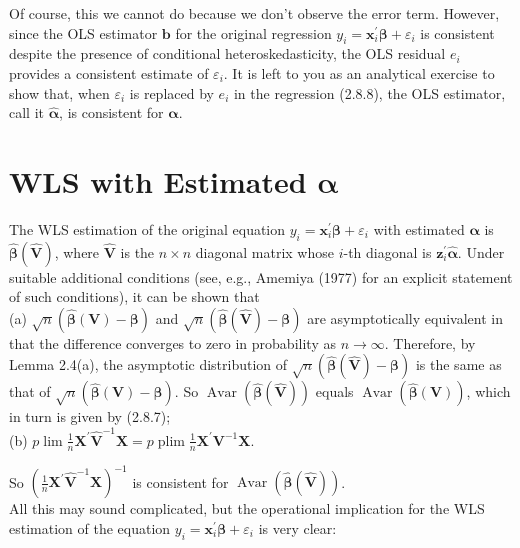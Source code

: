 \documentclass[10pt]{article}
\begin{document}
Of course, this we cannot do because we don't observe the error term. However, since the OLS estimator $\mathbf{b}$ for the original regression $y_{i}=\mathbf{x}_{i}^{\prime} \boldsymbol{\beta}+\varepsilon_{i}$ is consistent despite the presence of conditional heteroskedasticity, the OLS residual $e_{i}$ provides a consistent estimate of $\varepsilon_{i}$. It is left to you as an analytical exercise to show that, when $\varepsilon_{i}$ is replaced by $e_{i}$ in the regression (2.8.8), the OLS estimator, call it $\hat{\boldsymbol{\alpha}}$, is consistent for $\boldsymbol{\alpha}$.

\section*{WLS with Estimated $\boldsymbol{\alpha}$}
The WLS estimation of the original equation $y_{i}=\mathbf{x}_{i}^{\prime} \boldsymbol{\beta}+\varepsilon_{i}$ with estimated $\boldsymbol{\alpha}$ is $\widehat{\boldsymbol{\beta}}(\widehat{\mathbf{V}})$, where $\widehat{\mathbf{V}}$ is the $n \times n$ diagonal matrix whose $i$-th diagonal is $\mathbf{z}_{i}^{\prime} \hat{\boldsymbol{\alpha}}$. Under suitable additional conditions (see, e.g., Amemiya (1977) for an explicit statement of such conditions), it can be shown that\\
(a) $\sqrt{n}(\widehat{\boldsymbol{\beta}}(\mathbf{V})-\boldsymbol{\beta})$ and $\sqrt{n}(\widehat{\boldsymbol{\beta}}(\widehat{\mathbf{V}})-\boldsymbol{\beta})$ are asymptotically equivalent in that the difference converges to zero in probability as $n \rightarrow \infty$. Therefore, by Lemma 2.4(a), the asymptotic distribution of $\sqrt{n}(\widehat{\boldsymbol{\beta}}(\widehat{\mathbf{V}})-\boldsymbol{\beta})$ is the same as that of $\sqrt{n}(\widehat{\boldsymbol{\beta}}(\mathbf{V})-\boldsymbol{\beta})$. So $\operatorname{Avar}(\widehat{\boldsymbol{\beta}}(\widehat{\mathbf{V}}))$ equals $\operatorname{Avar}(\widehat{\boldsymbol{\beta}}(\mathbf{V}))$, which in turn is given by (2.8.7);\\
(b) $p \lim \frac{1}{n} \mathbf{X}^{\prime} \widehat{\mathbf{V}}^{-1} \mathbf{X}=p \operatorname{plim} \frac{1}{n} \mathbf{X}^{\prime} \mathbf{V}^{-1} \mathbf{X}$.

So $\left(\frac{1}{n} \mathbf{X}^{\prime} \widehat{\mathbf{V}}^{-1} \mathbf{X}\right)^{-1}$ is consistent for $\operatorname{Avar}(\widehat{\boldsymbol{\beta}}(\widehat{\mathbf{V}}))$.\\
All this may sound complicated, but the operational implication for the WLS estimation of the equation $y_{i}=\mathbf{x}_{i}^{\prime} \boldsymbol{\beta}+\varepsilon_{i}$ is very clear:
\end{document}
